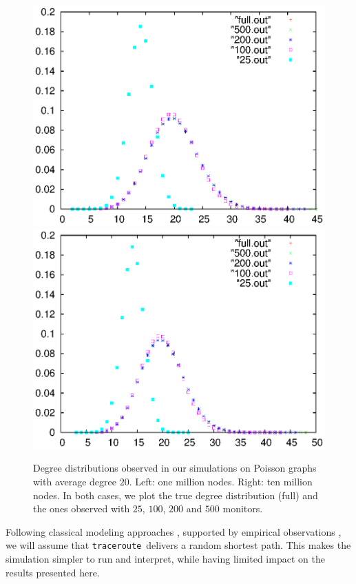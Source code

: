 \documentclass[conference]{IEEEtran}
\newcommand{\traceroute}{{\tt traceroute}}
\begin{document}
\begin{figure}
\centering
\includegraphics[scale=.5]{poisson_20_1M.eps}
\includegraphics[scale=.5]{erdos_20_10M.eps}
\caption{
Degree distributions observed in our simulations on Poisson graphs with average degree $20$. Left: one million nodes. Right: ten million nodes. In both cases, we plot the true degree distribution (full) and the ones observed with $25$, $100$, $200$ and $500$ monitors.
}
\label{fig-simul}
\end{figure}

Following classical modeling approaches \cite{DBLP:conf/infocom/LakhinaBCX03,DBLP:journals/cn/GuillaumeLM06}, supported by empirical observations \cite{DBLP:journals/cn/GuillaumeLM06}, we will assume that \traceroute\ delivers a random shortest path. This makes the simulation simpler to run and interpret, while having limited impact on the results presented here.
\end{document}
